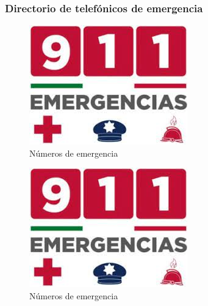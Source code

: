 \subsubsection{Directorio de telefónicos de emergencia}

\begin{figure}[H]
    \centering
    \includegraphics[scale=0.4]{10/Img/911.jpg}
    \caption{Números de emergencia }
    \label{fig:911.png}
\end{figure}

\begin{figure}[H]
    \centering
    \includegraphics[scale=0.4]{10/Img/911.jpg}
    \caption{Números de emergencia }
    \label{fig:911.png}
\end{figure}
    
